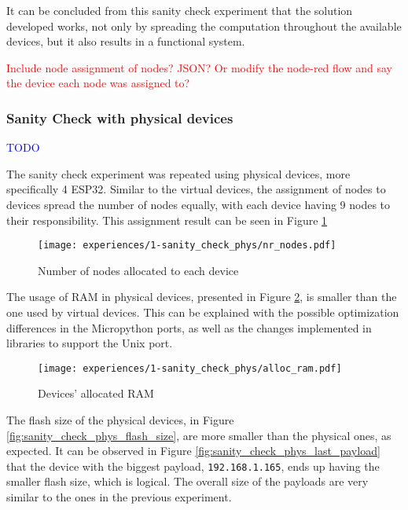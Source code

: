 It can be concluded from this sanity check experiment that the solution developed works, not only by spreading the computation throughout the available devices, but it also results in a functional system.

\textcolor{red}{Include node assignment of nodes? JSON? Or modify the node-red flow and say the device each node was assigned to?}


\subsubsection{Sanity Check with physical devices}

\textcolor{blue}{TODO}

The sanity check experiment was repeated using physical devices, more specifically 4 ESP32. Similar to the virtual devices, the assignment of nodes to devices spread the number of nodes equally, with each device having 9 nodes to their responsibility. This assignment result can be seen in Figure \ref{fig:sanity_check_phys_nr_nodes}

\begin{figure}[h]
\centering
\texttt{[image: experiences/1-sanity\_check\_phys/nr\_nodes.pdf]}
\caption[Number of nodes allocated to each device]{Number of nodes allocated to each device}\label{fig:sanity_check_phys_nr_nodes}
\end{figure}

The usage of RAM in physical devices, presented in Figure \ref{fig:sanity_check_phys_alloc_ram}, is smaller than the one used by virtual devices. This can be explained with the possible optimization differences in the Micropython ports, as well as the changes implemented in libraries to support the Unix port.
    
\begin{figure}[h]
\centering
\texttt{[image: experiences/1-sanity\_check\_phys/alloc\_ram.pdf]}
\caption[Devices' allocated RAM]{Devices' allocated RAM}\label{fig:sanity_check_phys_alloc_ram}
\end{figure}

The flash size  of the physical devices, in Figure \ref{fig:sanity_check_phys_flash_size}, are more smaller than the physical ones, as expected. It can be observed in Figure \ref{fig:sanity_check_phys_last_payload} that the device with the biggest payload, \texttt{192.168.1.165}, ends up having the smaller flash size, which is logical. The overall size of the payloads are very similar to the ones in the previous experiment. 

